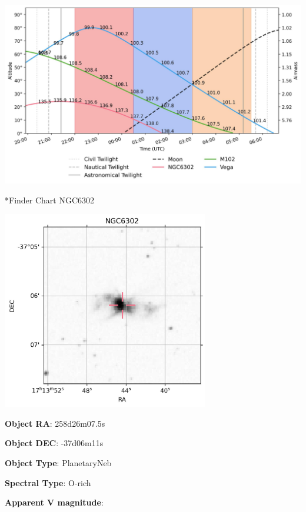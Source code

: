 \documentclass[12pt,preprintnumbers,amsmath,amssymb,nofootinbib,superscriptaddress]{revtex4-1}
\begin{document}
\begin{center}
    \includegraphics[height=0.8\textheight]{example_output/airmass.jpg}
\end{center}


\newpage

*{Finder Chart NGC6302}\label{Ueff}

\begin{minipage}{0.6\textwidth}
    \includegraphics[width=9cm]{example_output/finder_NGC6302.jpg}
\vspace{-2cm}

\end{minipage}
\begin{minipage}{0.3\textwidth}

\textbf{Object RA}: 258d26m07.5s

\textbf{Object DEC}: -37d06m11s

\textbf{Object Type}: PlanetaryNeb

\textbf{Spectral Type}: O-rich

\textbf{Apparent V magnitude}:  

\end{minipage}
\end{document}
